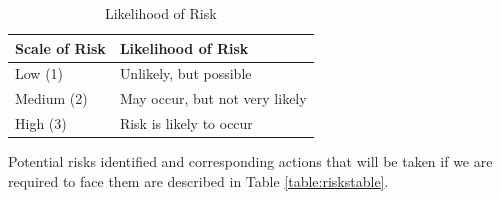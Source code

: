 \documentclass{article}
\begin{document}
\begin{table}[h]
\begin{center}
\begin{small}
\begin{tabular}{|l|p{3cm}|}
\hline
\rowcolor[HTML]{C0C0C0}Scale of Risk & Likelihood of Risk                     \\ \hline
Low (1)    & Unlikely, but possible                                            \\ \hline
Medium (2) & May occur, but not very likely                                    \\ \hline
High (3)   & Risk is likely to occur                                           \\ \hline
\end{tabular}
\end{small}
\end{center}
\caption{Likelihood of Risk}
\label{table:likelihood}
\end{table}

Potential risks identified and corresponding actions that will be taken if we are required to face them are described in Table \ref{table:riskstable}.
\end{document}
